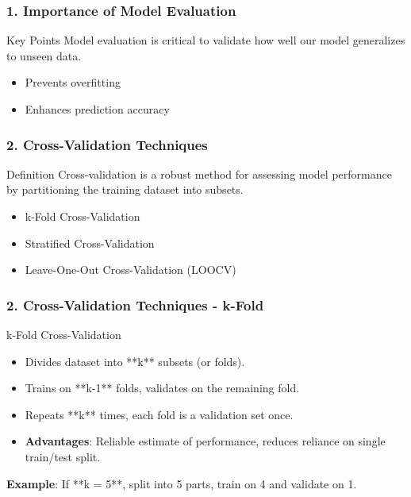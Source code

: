 \documentclass{beamer}
\begin{document}
\begin{frame}[fragile]
    \frametitle{1. Importance of Model Evaluation}
    \begin{block}{Key Points}
        Model evaluation is critical to validate how well our model generalizes to unseen data. 
        \begin{itemize}
            \item Prevents overfitting
            \item Enhances prediction accuracy
        \end{itemize}
    \end{block}
\end{frame}

\begin{frame}[fragile]
    \frametitle{2. Cross-Validation Techniques}
    \begin{block}{Definition}
        Cross-validation is a robust method for assessing model performance by partitioning the training dataset into subsets.
    \end{block}
    
    \begin{itemize}
        \item k-Fold Cross-Validation
        \item Stratified Cross-Validation
        \item Leave-One-Out Cross-Validation (LOOCV)
    \end{itemize}
\end{frame}

\begin{frame}[fragile]
    \frametitle{2. Cross-Validation Techniques - k-Fold}
    \begin{block}{k-Fold Cross-Validation}
        \begin{itemize}
            \item Divides dataset into **k** subsets (or folds).
            \item Trains on **k-1** folds, validates on the remaining fold.
            \item Repeats **k** times, each fold is a validation set once.
            \item \textbf{Advantages}: Reliable estimate of performance, reduces reliance on single train/test split.
        \end{itemize}
        
        \textbf{Example}: If **k = 5**, split into 5 parts, train on 4 and validate on 1.
    \end{block}
\end{frame}
\end{document}
